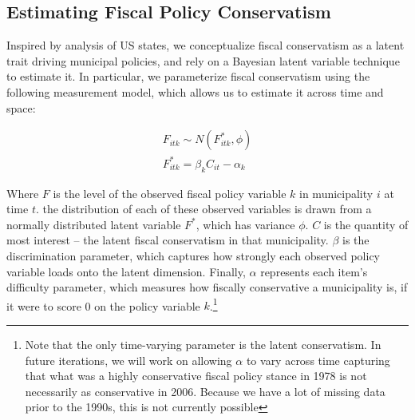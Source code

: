 \documentclass[a4paper,12pt]{article}
\begin{document}

\subsection*{Estimating Fiscal Policy Conservatism}
Inspired by \cite{caughey2016dynamics} analysis of US states, we conceptualize fiscal conservatism as a latent trait driving municipal policies, and rely on a Bayesian latent variable technique to estimate it. In particular, we parameterize fiscal conservatism using the following measurement model, which allows us to estimate it across time and space:

\begin{gather*}
F_{itk} \sim N(F^*_{itk}, \phi)\\
F^*_{itk} = \beta_k C_{it} - \alpha_{k}
\end{gather*}

\noindent Where $F$ is the level of the observed fiscal policy variable $k$ in municipality $i$ at time $t$. the distribution of each of these observed variables is drawn from a normally distributed latent variable $F^*$, which has variance $\phi$. $C$ is the quantity of most interest -- the latent fiscal conservatism in that municipality. $\beta$ is the discrimination parameter, which captures how strongly each observed policy variable loads onto the latent dimension. Finally, $\alpha$ represents each item's difficulty parameter, which measures how fiscally conservative a municipality is, if it were to score 0 on the policy variable $k$.\footnote{Note that the only time-varying parameter is the latent conservatism. In future iterations, we will work on allowing $\alpha$ to vary across time capturing that what was a highly conservative fiscal policy stance in 1978 is not necessarily as conservative in 2006. Because we have a lot of missing data prior to the 1990s, this is not currently possible}
\end{document}
